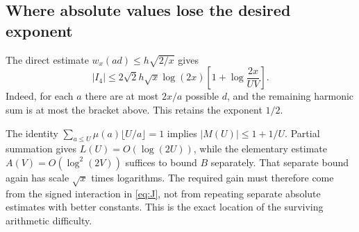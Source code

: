 \subsection{Where absolute values lose the desired exponent}
The direct estimate $w_x(ad)\le h\sqrt{2/x}$ gives
\begin{equation}\label{eq:I4absolute}
|I_4|\le2\sqrt2h\sqrt x\log(2x)\left[1+\log\frac{2x}{UV}\right].
\end{equation}
Indeed, for each $a$ there are at most $2x/a$ possible $d$, and the remaining harmonic sum is at most the bracket above. This retains the exponent $1/2$.

The identity $\sum_{a\le U}\mu(a)\lfloor U/a\rfloor=1$ implies $|M(U)|\le1+1/U$. Partial summation gives $L(U)=O(\log(2U))$, while the elementary estimate $A(V)=O(\log^2(2V))$ suffices to bound $B$ separately. That separate bound again has scale $\sqrt x$ times logarithms. The required gain must therefore come from the signed interaction in \eqref{eq:J}, not from repeating separate absolute estimates with better constants. This is the exact location of the surviving arithmetic difficulty.
